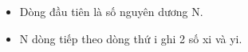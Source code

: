 \begin{itemize}
	\item     Dòng đầu tiên là số nguyên dương N.   
	\item     N dòng tiếp theo dòng thứ i ghi 2 số xi và yi.   
\end{itemize}

\
